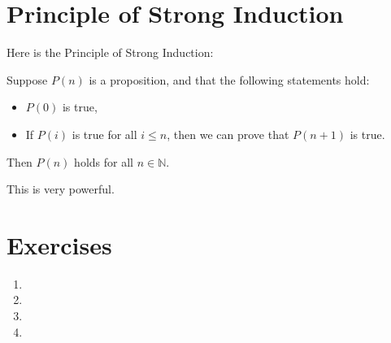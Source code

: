\section{Principle of Strong Induction}

Here is the Principle of Strong Induction:

\begin{theorem}
Suppose $P(n)$ is a proposition, and that the following statements hold:
\begin{itemize}
    \item $P(0)$ is true,
    \item If $P(i)$ is true for all $i \leq n$, then we can prove that $P(n + 1)$ is true.
\end{itemize}
Then $P(n)$ holds for all $n \in \mathbb{N}$.
\end{theorem}

This is very powerful.

\section{Exercises}
\begin{enumerate}
    \item 
    \item 
    \item 
    \item 
\end{enumerate}
